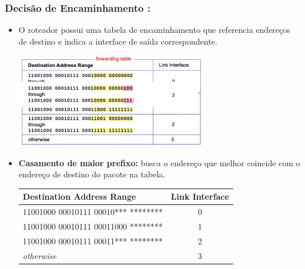         \subsubsection*{Decisão de Encaminhamento :} 
    
            \begin{itemize}[left=0.5cm, align=left, nosep]
                \item O roteador possui uma tabela de encaminhamento que referencia endereços de destino e indica a interface de saída correspondente.
            
                \begin{center}
                    \includegraphics[width=0.65\textwidth]{img/cap-04/tabela-de-encaminhamento.png}
                \end{center}

                \item \textbf{Casamento de maior prefixo:} busca o endereço que melhor coincide com o endereço de destino do pacote na tabela.
            
                \begin{table}[h!]
                    \centering
                    \renewcommand{\arraystretch}{1.2}
                    \setlength{\tabcolsep}{6pt}

                    \begin{tabular}{|l|c|}
                        \hline
                        \textbf{Destination Address Range} & \textbf{Link Interface} \\ \hline
                        11001000 00010111 00010*** ******** & 0 \\ \hline
                        11001000 00010111 00011000 ******** & 1 \\ \hline
                        11001000 00010111 00011*** ******** & 2 \\ \hline
                        \textit{otherwise} & 3 \\ \hline
                    \end{tabular}


\end{table}
\end{itemize}

